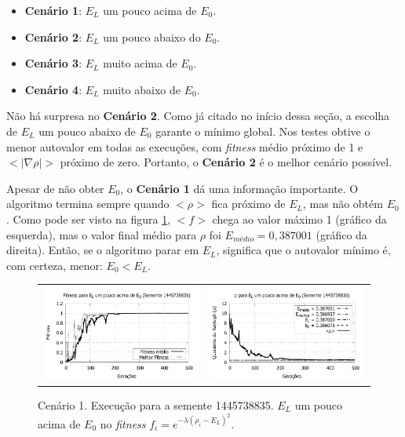 	\begin{itemize}
	
		\item \textbf{Cenário 1}: $E_L$ um pouco acima de $E_0$.
			
		\item \textbf{Cenário 2}: $E_L$ um pouco abaixo do $E_0$.
		
		\item \textbf{Cenário 3}: $E_L$ muito acima de $E_0$.
		
		\item \textbf{Cenário 4}: $E_L$ muito abaixo de $E_0$.
	\end{itemize}
	
	
	Não há surpresa no \textbf{Cenário 2}. Como já citado no início dessa seção, a escolha de $E_L$ um pouco abaixo de $E_0$ garante o mínimo global. Nos testes obtive o menor autovalor em todas as execuções, com \emph{fitness} médio próximo de 1 e $<|\nabla \rho|>$ próximo de zero. Portanto, o \textbf{Cenário 2} é o melhor cenário possível.	
	
	Apesar de não obter $E_0$, o \textbf{Cenário 1} dá uma informação importante. O algoritmo termina sempre quando $<\rho>$ fica próximo de $E_L$, mas não obtém $E_0$. Como pode ser visto na figura \ref{fig:execucoesSemente_EL_umPoucoAcima}, $<f>$ chega ao valor máximo 1 (gráfico da esquerda), mas o valor final médio para $\rho$ foi $E_{médio} = 0,387001$ (gráfico da direita). Então, se o algoritmo parar em $E_L$, significa que o autovalor mínimo é, com certeza, menor: $E_0 < E_L$. 
	
	\begin{figure}[htbp]
	\centering
  \begin{tabular}{@{}cc@{}}
	
		\includegraphics[width=.45\textwidth]{figs/resultados/variandoELSemente/T1_S-1445738835_fitness.pdf} &
    \includegraphics[width=.45\textwidth]{figs/resultados/variandoELSemente/T1_S-1445738835_rho.pdf}
  \end{tabular}
  \caption{Cenário 1. Execução para a semente 1445738835. $E_L$ um pouco acima de $E_0$ no \textit{fitness} $f_i = e^{-\lambda(\rho_i - E_L)^2}$.}
	\label{fig:execucoesSemente_EL_umPoucoAcima}
	\end{figure}
	
